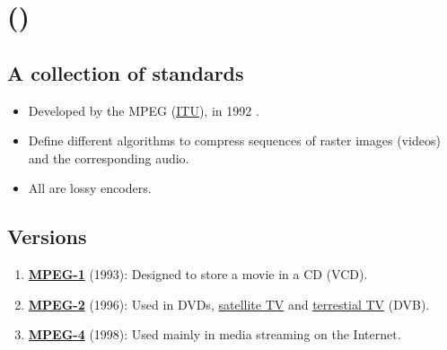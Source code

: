 \chapter{ ()}
\label{cha:MPEG}

\section{A collection of standards}
\begin{itemize}
\item Developed by the \gls{MPEG} (\href{https://www.itu.int}{ITU}),
  in 1992  \cite{wikipedia_MPEG}.
\item Define different algorithms to compress sequences of raster
  images (videos) and the corresponding audio.
\item All are lossy encoders.
\end{itemize}

\section{Versions}
\begin{enumerate}
\item \href{https://en.wikipedia.org/wiki/MPEG-1}{\textbf{MPEG-1}}
  (1993): Designed to store a movie in a \gls{CD} (\gls{VCD}).
\item \href{https://en.wikipedia.org/wiki/MPEG-2}{\textbf{MPEG-2}}
  (1996): Used in \glspl{DVD}, \href{https://en.wikipedia.org/wiki/Satellite_television}{satellite TV} and \href{https://en.wikipedia.org/wiki/Digital_television}{terrestial TV} (\gls{DVB}).
\item \href{https://en.wikipedia.org/wiki/MPEG-4}{\textbf{MPEG-4}}
  (1998): Used mainly in media streaming on the Internet.
\end{enumerate}

